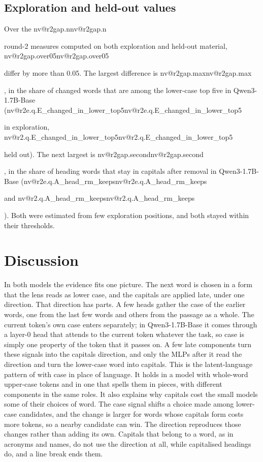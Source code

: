 \documentclass[11pt]{article}
\makeatletter
\newcommand{\nv}[1]{\ifcsname nv@#1\endcsname\csname nv@#1\endcsname\else\PackageError{numbers}{Unknown number key #1}{}\fi}
\newcommand{\qw}{Qwen3-1.7B-Base}
\newcommand{\RQ}[1]{\nv{r2.q.#1}}
\newcommand{\XQ}[1]{\nv{r2e.q.#1}}
\makeatother
\begin{document}
\subsection{Exploration and held-out values}

Over the \nv{r2gap.n} round-2 measures computed on both exploration and held-out material, \nv{r2gap.over05} differ by more than 0.05. The largest difference is \nv{r2gap.max}, in the share of changed words that are among the lower-case top five in \qw{} (\XQ{E_changed_in_lower_top5} in exploration, \RQ{E_changed_in_lower_top5} held out). The next largest is \nv{r2gap.second}, in the share of heading words that stay in capitals after removal in \qw{} (\XQ{A_head_rm_keeps} and \RQ{A_head_rm_keeps}). Both were estimated from few exploration positions, and both stayed within their thresholds.

\section{Discussion}
\label{sec:discussion}

In both models the evidence fits one picture. The next word is chosen in a form that the lens reads as lower case, and the capitals are applied late, under one direction. That direction has parts. A few heads gather the case of the earlier words, one from the last few words and others from the passage as a whole. The current token's own case enters separately; in \qw{} it comes through a layer-0 head that attends to the current token whatever the task, so case is simply one property of the token that it passes on. A few late components turn these signals into the capitals direction, and only the MLPs after it read the direction and turn the lower-case word into capitals. This is the latent-language pattern of \citet{wendler2024llamas} with case in place of language. It holds in a model with whole-word upper-case tokens and in one that spells them in pieces, with different components in the same roles. It also explains why capitals cost the small models some of their choices of word. The case signal shifts a choice made among lower-case candidates, and the change is larger for words whose capitals form costs more tokens, so a nearby candidate can win. The direction reproduces those changes rather than adding its own. Capitals that belong to a word, as in acronyms and names, do not use the direction at all, while capitalised headings do, and a line break ends them.
\end{document}
